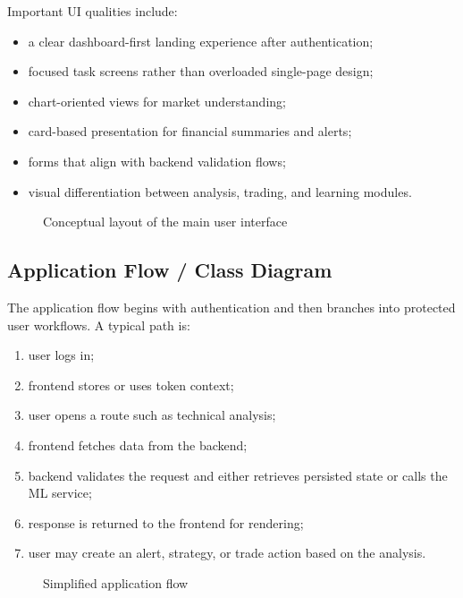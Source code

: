 \documentclass[12pt,a4paper]{report}
\begin{document}
Important UI qualities include:
\begin{itemize}
\item a clear dashboard-first landing experience after authentication;
\item focused task screens rather than overloaded single-page design;
\item chart-oriented views for market understanding;
\item card-based presentation for financial summaries and alerts;
\item forms that align with backend validation flows;
\item visual differentiation between analysis, trading, and learning modules.
\end{itemize}

\begin{figure}[H]
\centering
{}
\caption{Conceptual layout of the main user interface}
\end{figure}

\subsection{Application Flow / Class Diagram}
The application flow begins with authentication and then branches into protected user workflows. A typical path is:
\begin{enumerate}[label=\arabic*.]
\item user logs in;
\item frontend stores or uses token context;
\item user opens a route such as technical analysis;
\item frontend fetches data from the backend;
\item backend validates the request and either retrieves persisted state or calls the ML service;
\item response is returned to the frontend for rendering;
\item user may create an alert, strategy, or trade action based on the analysis.
\end{enumerate}

\begin{figure}[H]
\centering
{}
\caption{Simplified application flow}
\end{figure}
\end{document}
